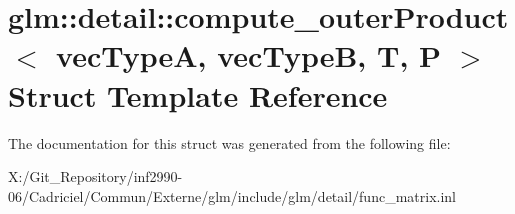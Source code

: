 \hypertarget{structglm_1_1detail_1_1compute__outer_product}{\section{glm\-:\-:detail\-:\-:compute\-\_\-outer\-Product$<$ vec\-Type\-A, vec\-Type\-B, T, P $>$ Struct Template Reference}
\label{structglm_1_1detail_1_1compute__outer_product}
}


The documentation for this struct was generated from the following file\-:\begin{DoxyCompactItemize}
\item 
X\-:/\-Git\-\_\-\-Repository/inf2990-\/06/\-Cadriciel/\-Commun/\-Externe/glm/include/glm/detail/func\-\_\-matrix.\-inl\end{DoxyCompactItemize}
